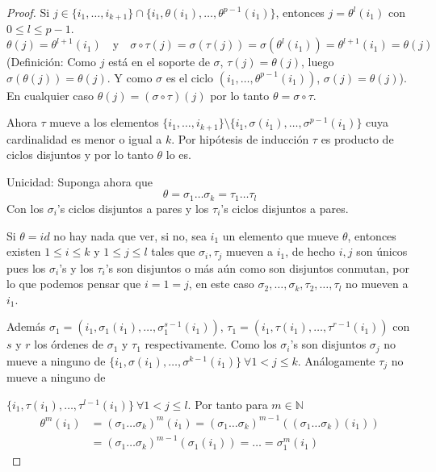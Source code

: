 \begin{proof}
    Si $j \in \{i_1, \dots, i_{k+1}\} \cap \{i_1, \theta(i_1), \dots, \theta^{p-1}(i_1)\}$, entonces $j = \theta^l(i_1)$ con $0 \leq l \leq p-1$.
    \begin{equation*}
        \theta(j) = \theta^{l+1}(i_1) \quad \text{y} \quad \sigma \circ \tau(j) = \sigma(\tau(j)) = \sigma(\theta^l(i_1))= \theta^{l+1}(i_1) =\theta(j)
    \end{equation*}
    (Definición: Como $j$ está en el soporte de $\sigma$, $\tau(j)=\theta(j)$, luego $\sigma(\theta(j)) = \theta(j)$. Y como $\sigma$ es el ciclo $(i_1, \dots, \theta^{p-1}(i_1))$, $\sigma(j) = \theta(j)$).
    En cualquier caso $\theta(j) = (\sigma \circ \tau)(j)$ por lo tanto $\theta = \sigma \circ \tau$.
    
    Ahora $\tau$ mueve a los elementos $\{i_1, \dots, i_{k+1}\} \setminus \{i_1, \sigma(i_1), \dots, \sigma^{p-1}(i_1)\}$ cuya cardinalidad es menor o igual a $k$. Por hipótesis de inducción $\tau$ es producto de ciclos disjuntos y por lo tanto $\theta$ lo es.
    
    Unicidad: Suponga ahora que
    \begin{equation*}
        \theta = \sigma_1 \dots \sigma_k = \tau_1 \dots \tau_l
    \end{equation*}
    Con los $\sigma_i$'s ciclos disjuntos a pares y los $\tau_i$'s ciclos disjuntos a pares.
    
    Si $\theta = id$ no hay nada que ver, si no, sea $i_1$ un elemento que mueve $\theta$, entonces existen $1 \leq i \leq k$ y $1 \leq j \leq l$ tales que $\sigma_i, \tau_j$ mueven a $i_1$, de hecho $i, j$ son únicos pues los $\sigma_i$'s y los $\tau_i$'s son disjuntos o más aún como son disjuntos conmutan, por lo que podemos pensar que $i=1=j$, en este caso $\sigma_2, \dots, \sigma_k, \tau_2, \dots, \tau_l$ no mueven a $i_1$.
    
    Además $\sigma_1 = (i_1, \sigma_1(i_1), \dots, \sigma_1^{s-1}(i_1))$, $\tau_1 = (i_1, \tau(i_1), \dots, \tau^{r-1}(i_1))$ con $s$ y $r$ los órdenes de $\sigma_1$ y $\tau_1$ respectivamente. Como los $\sigma_i$'s son disjuntos $\sigma_j$ no mueve a ninguno de $\{i_1, \sigma(i_1), \dots, \sigma^{k-1}(i_1)\} \ \forall 1 < j \leq k$. Análogamente $\tau_j$ no mueve a ninguno de \par $\{i_1, \tau(i_1), \dots, \tau^{l-1}(i_1)\} \ \forall 1 < j \leq l$. Por tanto para $m \in \mathbb{N}$
    \begin{equation*}
    \begin{aligned}
        \theta^m(i_1) &= (\sigma_1 \dots \sigma_k)^m(i_1) = (\sigma_1 \dots \sigma_k)^{m-1}((\sigma_1 \dots \sigma_k)(i_1)) \\
        &= (\sigma_1 \dots \sigma_k)^{m-1}(\sigma_1(i_1)) = \dots = \sigma_1^m(i_1)
    \end{aligned}
    \end{equation*}
    

\end{proof}

